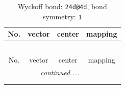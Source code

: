 \documentclass[fleqn,8pt]{jsarticle}
\begin{document}
\renewcommand{\arraystretch}{1.2}
\begin{longtable}{cccc}
\caption{Wyckoff bond: {\tt 24d@4d}, bond symmetry: {\tt 1}}
 \\
 \hline \hline
No. & vector & center & mapping \\ \hline \endfirsthead

\multicolumn{3}{l}{\tablename\ \thetable{}} \\
 \hline \hline
No. & vector & center & mapping \\ \hline \endhead

 \hline \hline
\multicolumn{3}{r}{\footnotesize\it continued ...} \\ \endfoot

 \hline \hline
\multicolumn{3}{r}{} \\ \endlastfoot


\end{longtable}
\end{document}
